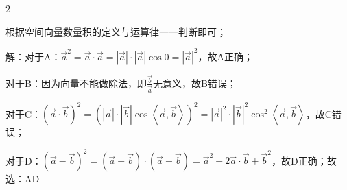 \begin{multicols}{2}


\bindp [分析]根据空间向量数量积的定义与运算律一一判断即可；

\bindp [详解]解：对于A：\({\overrightarrow{a}}^{2} = \overrightarrow{a} \cdot \overrightarrow{a} = \left| \overrightarrow{a} \right| \cdot \left| \overrightarrow{a} \right|\cos 0 = \left| \overrightarrow{a} \right|^{2}\)，故A正确；

\bindp 对于B：因为向量不能做除法，即\(\frac{\overrightarrow{b}}{\overrightarrow{a}}\)无意义，故B错误；

\bindp 对于C：\(\left( \overrightarrow{a} \cdot \overrightarrow{b} \right)^{2} = \left( \left| \overrightarrow{a} \right| \cdot \left| \overrightarrow{b} \right|\cos\left\langle \overrightarrow{a},\overrightarrow{b} \right\rangle \right)^{2} = \left| \overrightarrow{a} \right|^{2} \cdot \left| \overrightarrow{b} \right|^{2}\cos^{2}\left\langle \overrightarrow{a},\overrightarrow{b} \right\rangle\)，故C错误；

\bindp 对于D：\(\left( \overrightarrow{a} - \overrightarrow{b} \right)^{2} = \left( \overrightarrow{a} - \overrightarrow{b} \right) \cdot \left( \overrightarrow{a} - \overrightarrow{b} \right) = {\overrightarrow{a}}^{2} - 2\overrightarrow{a} \cdot \overrightarrow{b} + {\overrightarrow{b}}^{2}\)，故D正确；故选：AD






\end{multicols}

